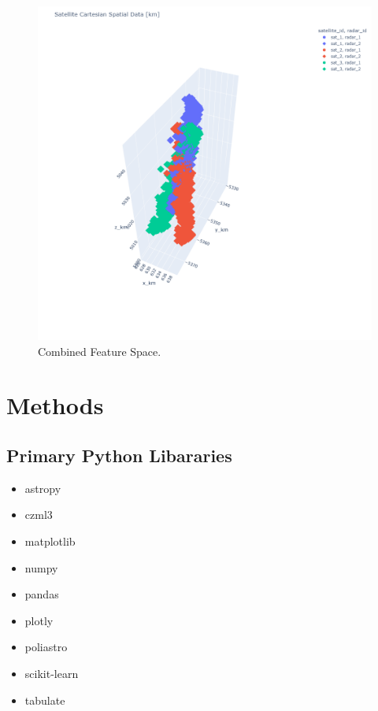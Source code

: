 \documentclass[./report_entry.tex]{subfiles}
\begin{document}
    \begin{figure}[!htbp]
        \centering
        \includegraphics[scale=0.43]{../graphics/overlap.png}
        \caption{Combined Feature Space.}
        \label{feature_plot}
    \end{figure}

    \clearpage
    \section*{Methods}
        \subsection*{Primary Python Libararies}
            \begin{itemize}
                \setlength{\itemsep}{0pt}%
                \setlength{\parskip}{0pt}%
                \item astropy
                \item czml3
                \item matplotlib
                \item numpy
                \item pandas
                \item plotly
                \item poliastro
                \item scikit-learn
                \item tabulate
            \end{itemize}
\end{document}
